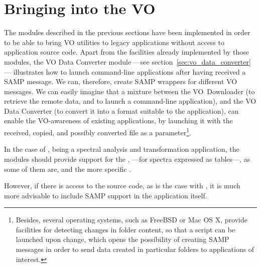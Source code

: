 		
	
	\section{Bringing \massa{} into the VO}
	\label{sec:bringing_massa_into_the_vo}
		
		The modules described in the previous
		sections have been implemented
		in order to be able to bring VO utilities to legacy
		applications without access to application source code.
		Apart from the facilities already implemented by those
		modules, the VO Data Converter module
		---see section~\ref{sec:vo_data_converter}--- illustrates
		how to launch command-line applications after having
		received a SAMP message. We can, therefore, create SAMP
		wrappers for different VO messages. We can easily imagine
		that a mixture between the VO~Downloader (to retrieve the
		remote data, and to launch a command-line application), and
		the VO Data Converter (to convert it into a format suitable
		to the application), can enable the VO-awareness of
		existing applications, by launching it with the received,
		copied, and possibly converted file as a
		parameter\footnote{Besides, several operating systems, such
		as FreeBSD or Mac OS X, provide facilities for detecting
		changes in folder content, so that a script can be launched
		upon change, which opens the possibility of creating SAMP
		messages in order to send data created in particular
		folders to applications of interest.}.
		
		In the case of \massa{}, being a spectral analysis and
		transformation application, the modules should provide
		support for the ,
		 ---for spectra expressed as
		tables---, as some of them are, and the more specific
		.
		
		However, if there is access to the source code, as is the
		case with \massa{}, it is much more advisable to
		include SAMP support in the application itself.
		
